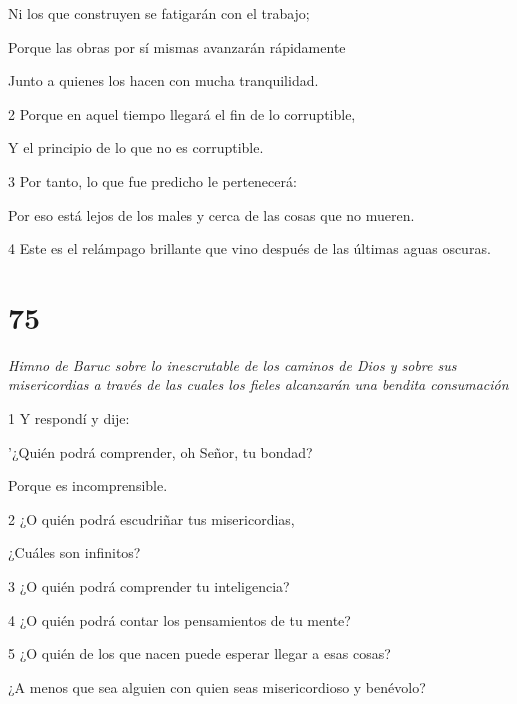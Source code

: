\par Ni los que construyen se fatigarán con el trabajo;

\par Porque las obras por sí mismas avanzarán rápidamente

\par Junto a quienes los hacen con mucha tranquilidad.

\par 2 Porque en aquel tiempo llegará el fin de lo corruptible,

\par Y el principio de lo que no es corruptible.

\par 3 Por tanto, lo que fue predicho le pertenecerá:

Por eso está lejos de los males y cerca de las cosas que no mueren.

\par 4 Este es el relámpago brillante que vino después de las últimas aguas oscuras.

\chapter{75}

\par \textit{Himno de Baruc sobre lo inescrutable de los caminos de Dios y sobre sus misericordias a través de las cuales los fieles alcanzarán una bendita consumación}

\par 1 Y respondí y dije:

'¿Quién podrá comprender, oh Señor, tu bondad?

\par Porque es incomprensible.

\par 2 ¿O quién podrá escudriñar tus misericordias,

\par ¿Cuáles son infinitos?

\par 3 ¿O quién podrá comprender tu inteligencia?

\par 4 ¿O quién podrá contar los pensamientos de tu mente?

\par 5 ¿O quién de los que nacen puede esperar llegar a esas cosas?

\par ¿A menos que sea alguien con quien seas misericordioso y benévolo?

